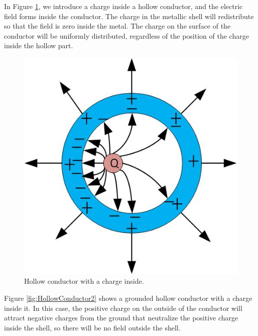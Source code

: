 \documentclass{ximera}
\begin{document}
In Figure \ref{fig:HollowConductor1}, we introduce a charge inside a hollow conductor, and the electric field forms inside the conductor. The charge in the metallic shell will redistribute so that the field is zero inside the metal. The charge on the surface of the conductor will be uniformly distributed, regardless of the position of the charge inside the hollow part.


\begin{figure}[htbp]
\begin{center}
\includegraphics[scale=1]{../jpg/hollowConductorOffset.jpg}
\end{center}
\caption{Hollow conductor with a charge inside.}
\label{fig:HollowConductor1}
\end{figure}

Figure \ref{fig:HollowConductor2} shows a grounded hollow conductor with a charge inside it. In this case, the positive charge on the outside of the conductor will attract negative charges from the ground that neutralize the positive charge inside the shell, so there will be no field outside the shell.
\end{document}
